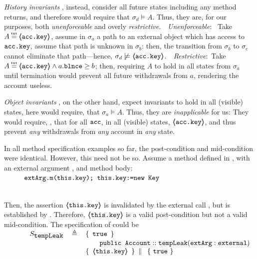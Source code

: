 {{\emph{History  invariants}} \cite{liskov94behavioral,usinghistory,Cohen10}, instead, consider {all  future states including any method returns}, and therefore {would  require that   $\sigma_d \models A$. Thus, they are,}  for our purposes,  both
 \emph{unenforceable} and overly \emph{restrictive}.\ \  \emph{Unenforceable}: \ Take $A \txteq \inside{\prg{acc.key}}$,  assume  in $\sigma_a$ a path to an external object which has access to $\mbox{\normalfont{\texttt{acc.key}}}$, assume that path is unknown in $\sigma_b$: then, the transition from $\sigma_b$ to $\sigma_c$ cannot eliminate that path—hence, $\sigma_d \not\models \langle\!\!\langle \mbox{\normalfont{\texttt{acc.key}}} \rangle\!\!\rangle$.\ \  \emph{Restrictive}:\ Take $A \txteq \inside{\prg{acc.key}}\wedge a.\prg{blnce}\geq b$; then,  requiring  $A$   to hold in all states from $\sigma_a$ until termination would prevent all future withdrawals from $a$, rendering the account useless.

{\emph{Object invariants}}  \cite{Meyer92,MeyerDBC92,BarDelFahLeiSch04,objInvars,MuellerPoetzsch-HeffterLeavens06}, on the other hand, expect %
invariants to hold in all (visible) states,
here would require,  \eg that $\sigma_a \models A$. Thus, they  are %
\emph{inapplicable} for us: They would require, \eg, that for all %
 $\mbox{\normalfont{\texttt{acc}}}$, in all (visible) states, $\langle\!\!\langle \mbox{\normalfont{\texttt{acc.key}}} \rangle\!\!\rangle$, and thus prevent \emph{any} withdrawals from \emph{any} account in \emph{any} state.
 
 

In all  method specification examples so far, the post-condition and   mid-condition were identical.
However, this need not be so. 
Assume a method  defined in , with an external argument , and  method body:
\\
$\strut \hspace{1cm} \mbox{\normalfont{\texttt{extArg.m(this.key); this.key:=new Key}}}$} 
\\
Then, the assertion   $ \langle\!\!\langle \mbox{\normalfont{\texttt{this.key}}} \rangle\!\!\rangle$  is  invalidated by the external call , but is  established by .
Therefore, $ \langle\!\!\langle \mbox{\normalfont{\texttt{this.key}}} \rangle\!\!\rangle$  is a valid post-condition but not a valid   mid-condition.
The specification of  could be\\
$
{\sprepost
		{\strut \ \ \ \ \ \ \ \ \ S_{\prg{tempLeak}}} 
		{  \ \prg{true}\  }
		{\prg{public Account}} {\prg{tempLeak}} {\prg{extArg}:\prg{external}}
		{  \  \inside{\prg{this.key} }\  }
		{  \  \prg{true}\  }
}
$


